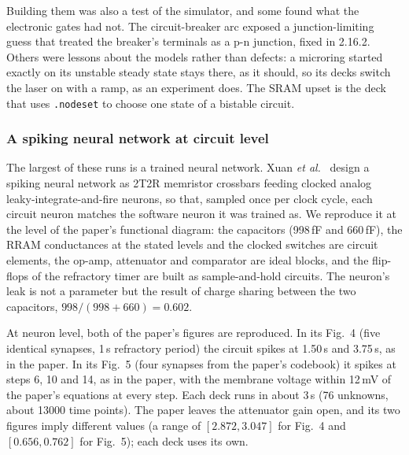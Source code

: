 Building them was also a test of the simulator, and some found what the electronic gates had
not. The circuit-breaker arc exposed a junction-limiting guess that treated the breaker's
terminals as a p-n junction, fixed in 2.16.2. Others were lessons about the models rather than
defects: a microring started exactly on its unstable steady state stays there, as it should, so
its decks switch the laser on with a ramp, as an experiment does. The SRAM upset is the deck that
uses \texttt{.nodeset} to choose one state of a bistable circuit.

\subsubsection{A spiking neural network at circuit level}
The largest of these runs is a trained neural network. Xuan \emph{et al.}~\cite{xuan2026snn}
design a spiking neural network as 2T2R memristor crossbars feeding clocked analog
leaky-integrate-and-fire neurons, so that, sampled once per clock cycle, each circuit neuron
matches the software neuron it was trained as. We reproduce it at the level of the paper's
functional diagram: the capacitors (998\,fF and 660\,fF), the RRAM conductances at the stated
levels and the clocked switches are circuit elements, the op-amp, attenuator and comparator are
ideal blocks, and the flip-flops of the refractory timer are built as sample-and-hold circuits.
The neuron's leak is not a parameter but the result of charge sharing between the two
capacitors, $998/(998+660) = 0.602$.

At neuron level, both of the paper's figures are reproduced. In its Fig.~4 (five identical
synapses, 1\,\textmu s refractory period) the circuit spikes at 1.50\,\textmu s and
3.75\,\textmu s, as in the paper. In its Fig.~5 (four synapses from the paper's codebook) it
spikes at steps 6, 10 and 14, as in the paper, with the membrane voltage within 12\,mV of the
paper's equations at every step. Each deck runs in about 3\,s (76 unknowns, about
\num{13000} time points). The paper leaves the attenuator gain open, and its two figures imply
different values (a range of $[2.872, 3.047]$ for Fig.~4 and $[0.656, 0.762]$ for Fig.~5); each
deck uses its own.

